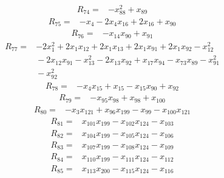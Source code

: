 {\begin{align*}
\end{align*}
\begin{align*}
R_{74} ={}& -x_{88}^{2} + x_{89}
\end{align*}
\begin{align*}
R_{75} ={}& -x_{4} - 2x_{4} x_{16} + 2x_{16} + x_{90}
\end{align*}
\begin{align*}
R_{76} ={}& -x_{14} x_{90} + x_{91}
\end{align*}
\begin{align*}
R_{77} ={}& -2x_{1}^{2} + 2x_{1} x_{12} + 2x_{1} x_{13} + 2x_{1} x_{91} + 2x_{1} x_{92} - x_{12}^{2} \\
&{}  - 2x_{12} x_{91} - x_{13}^{2} - 2x_{13} x_{92} + x_{17} x_{94} - x_{73} x_{89} - x_{91}^{2} \\
&{}  - x_{92}^{2}
\end{align*}
\begin{align*}
R_{78} ={}& -x_{4} x_{15} + x_{15} - x_{15} x_{90} + x_{92}
\end{align*}
\begin{align*}
R_{79} ={}& -x_{95} x_{98} + x_{98} + x_{100}
\end{align*}
\begin{align*}
R_{80} ={}& -x_{3} x_{121} + x_{96} x_{199} - x_{99} - x_{100} x_{121}
\end{align*}
\begin{align*}
R_{81} ={}& x_{101} x_{199} - x_{102} x_{124} - x_{103}
\end{align*}
\begin{align*}
R_{82} ={}& x_{104} x_{199} - x_{105} x_{124} - x_{106}
\end{align*}
\begin{align*}
R_{83} ={}& x_{107} x_{199} - x_{108} x_{124} - x_{109}
\end{align*}
\begin{align*}
R_{84} ={}& x_{110} x_{199} - x_{111} x_{124} - x_{112}
\end{align*}
\begin{align*}
R_{85} ={}& x_{113} x_{200} - x_{115} x_{124} - x_{116}

\end{align*}}
